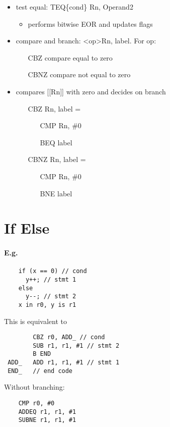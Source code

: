 \begin{itemize}
    \item test equal: TEQ\{cond\} Rn, Operand2
    \begin{itemize}
      \item performs bitwise EOR and updates flags
    \end{itemize}
    \item compare and branch: \textless op\textgreater Rn, label. For op:
    \begin{itemize}
      \item[CBZ] compare equal to zero
      \item[CBNZ] compare not equal to zero
    \end{itemize}
    \item compares [[Rn]] with zero and decides on branch
    \begin{itemize}
      \item[CBZ] Rn, label =
      \begin{itemize}
        \item[CMP] Rn, \#0
        \item[BEQ] label
      \end{itemize}
      \item[CBNZ] Rn, label =
      \begin{itemize}
        \item[CMP] Rn, \#0
        \item[BNE] label
      \end{itemize}
    \end{itemize}
  \end{itemize}

\section{If Else}
  \paragraph{E.g.}
  \begin{lstlisting}
    if (x == 0) // cond
      y++; // stmt 1
    else
      y--; // stmt 2
    x in r0, y is r1
  \end{lstlisting}
  This is equivalent to
  \begin{lstlisting}
        CBZ r0, ADD_ // cond
        SUB r1, r1, #1 // stmt 2
        B END
 ADD_   ADD r1, r1, #1 // stmt 1
 END_   // end code
  \end{lstlisting}
  Without branching:
  \begin{lstlisting}
    CMP r0, #0
    ADDEQ r1, r1, #1
    SUBNE r1, r1, #1
  \end{lstlisting}
